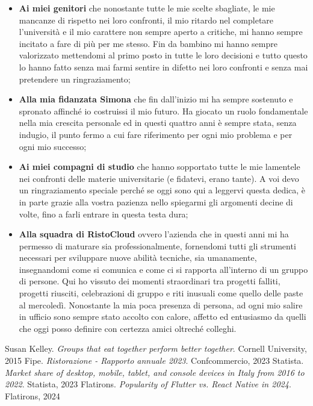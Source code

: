 \documentclass[a4paper, titlepage, 12pt, openright, oneside]{book}
\begin{document}
\begin{itemize}
	\item \textbf{Ai miei genitori} che nonostante tutte le mie scelte sbagliate, le mie mancanze di rispetto nei loro confronti, il mio ritardo nel completare l'università e il mio carattere non sempre aperto a critiche, mi hanno sempre incitato a fare di più per me stesso. Fin da bambino mi hanno sempre valorizzato mettendomi al primo posto in tutte le loro decisioni e tutto questo lo hanno fatto senza mai farmi sentire in difetto nei loro confronti e senza mai pretendere un ringraziamento;
	\item \textbf{Alla mia fidanzata Simona} che fin dall'inizio mi ha sempre sostenuto e spronato affinché io costruissi il mio futuro. Ha giocato un ruolo fondamentale nella mia crescita personale ed in questi quattro anni è sempre stata, senza indugio, il punto fermo a cui fare riferimento per ogni mio problema e per ogni mio successo;
	\item \textbf{Ai miei compagni di studio} che hanno sopportato tutte le mie lamentele nei confronti delle materie universitarie (e fidatevi, erano tante). A voi devo un ringraziamento speciale perché se oggi sono qui a leggervi questa dedica, è in parte grazie alla vostra pazienza nello spiegarmi gli argomenti decine di volte, fino a farli entrare in questa testa dura;
	\item \textbf{Alla squadra di RistoCloud} ovvero l'azienda che in questi anni mi ha permesso di maturare sia professionalmente, fornendomi tutti gli strumenti necessari per sviluppare nuove abilità tecniche, sia umanamente, insegnandomi come si comunica e come ci si rapporta all'interno di un gruppo di persone. Qui ho vissuto dei momenti straordinari tra progetti falliti, progetti riusciti, celebrazioni di gruppo e riti inusuali come quello delle paste al mercoledì. Nonostante la mia poca presenza di persona, ad ogni mio salire in ufficio sono sempre stato accolto con calore, affetto ed entusiasmo da quelli che oggi posso definire con certezza amici oltreché colleghi.
\end{itemize}

\begin{thebibliography}{4}
	 Susan Kelley. \textsl{Groups that eat together perform better together}. Cornell University, 2015
	 Fipe. \textsl{Ristorazione - Rapporto annuale 2023}. Confcommercio, 2023
	 Statista. \textsl{Market share of desktop, mobile, tablet, and console devices in Italy from 2016 to 2022}. Statista, 2023
	 Flatirons. \textsl{Popularity of Flutter vs. React Native in 2024}. Flatirons, 2024
\end{thebibliography}
\end{document}
